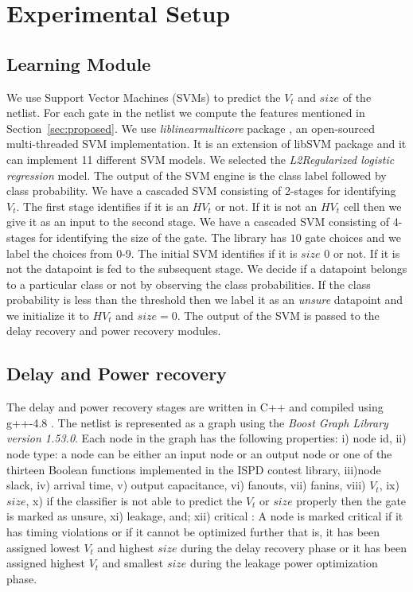\section{Experimental Setup}
\label{sec:experiment}
\subsection{Learning Module}
We use Support Vector Machines (SVMs) to predict the $V_t$ and $size$ of the netlist. For each gate in the netlist we compute the features mentioned in Section~\ref{sec:proposed}.
We use \emph{liblinearmulticore} package \cite{liblinear}, an open-sourced multi-threaded SVM implementation. It is an extension of libSVM \cite{libsvm} package and it can implement 11 different SVM models. We selected the \emph{L2Regularized logistic regression} model. The output of the SVM engine is the class label followed by class probability. We have a cascaded SVM  consisting of 2-stages for identifying $V_t$. The first stage identifies if it is an $HV_t$ or not. If it is not an $HV_t$ cell then we give it as an input to the second stage. We have a cascaded SVM consisting of 4-stages for identifying the size of the gate. The library has $10$ gate choices and we label the choices from 0-9. The initial SVM identifies if it is $size$ $0$ or not. If it is not the datapoint is fed to the subsequent stage. We decide if a datapoint belongs to a particular class or not by observing the class probabilities. If the class probability is less than the threshold then we label it as an \emph{unsure} datapoint and we initialize it to $HV_t$ and $size = 0$. The output of the SVM is passed to the delay recovery and power recovery modules.

\subsection{Delay and Power recovery}
The delay and power recovery stages are written in C++ and compiled using g++-4.8 . The netlist is represented as a graph using the \textit{Boost Graph Library version 1.53.0}. Each node in the graph has the following properties: 
i) node id,  ii) node type: a node can be either an input node or  an output node or one of the thirteen Boolean functions implemented in the ISPD contest library, iii)node slack, iv) arrival time, v) output capacitance, vi) fanouts, vii) fanins, viii) $V_t$, ix) $size$,  x) if the classifier is not able to predict the $V_t$ or $size$ properly then the gate is marked as unsure, xi) leakage, and; xii) critical : A node is marked critical if it has timing violations or if it cannot be optimized further that is, it has been assigned lowest $V_t$ and highest $size$ during the delay recovery phase or it has been assigned highest $V_t$ and smallest $size$ during the leakage power optimization phase.

